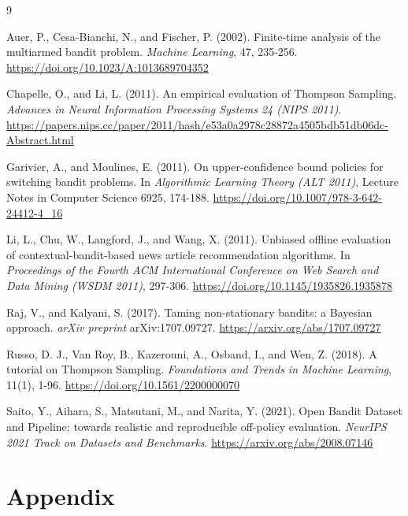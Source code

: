 \documentclass[11pt]{article}
\begin{document}
\begin{thebibliography}{9}
\setlength{\itemsep}{2pt}
\small

Auer, P., Cesa-Bianchi, N., and Fischer, P. (2002). Finite-time analysis of the
multiarmed bandit problem. \emph{Machine Learning}, 47, 235-256.
\url{https://doi.org/10.1023/A:1013689704352}

Chapelle, O., and Li, L. (2011). An empirical evaluation of Thompson Sampling.
\emph{Advances in Neural Information Processing Systems 24 (NIPS 2011)}.
\url{https://papers.nips.cc/paper/2011/hash/e53a0a2978c28872a4505bdb51db06dc-Abstract.html}

Garivier, A., and Moulines, E. (2011). On upper-confidence bound policies for
switching bandit problems. In \emph{Algorithmic Learning Theory (ALT 2011)},
Lecture Notes in Computer Science 6925, 174-188.
\url{https://doi.org/10.1007/978-3-642-24412-4_16}

Li, L., Chu, W., Langford, J., and Wang, X. (2011). Unbiased offline evaluation
of contextual-bandit-based news article recommendation algorithms. In
\emph{Proceedings of the Fourth ACM International Conference on Web Search and
Data Mining (WSDM 2011)}, 297-306.
\url{https://doi.org/10.1145/1935826.1935878}

Raj, V., and Kalyani, S. (2017). Taming non-stationary bandits: a Bayesian
approach. \emph{arXiv preprint} arXiv:1707.09727.
\url{https://arxiv.org/abs/1707.09727}

Russo, D. J., Van Roy, B., Kazerouni, A., Osband, I., and Wen, Z. (2018). A
tutorial on Thompson Sampling. \emph{Foundations and Trends in Machine
Learning}, 11(1), 1-96. \url{https://doi.org/10.1561/2200000070}

Saito, Y., Aihara, S., Matsutani, M., and Narita, Y. (2021). Open Bandit
Dataset and Pipeline: towards realistic and reproducible off-policy
evaluation. \emph{NeurIPS 2021 Track on Datasets and Benchmarks}.
\url{https://arxiv.org/abs/2008.07146}

\end{thebibliography}

\clearpage
\appendix
\section{Appendix}
\end{document}
